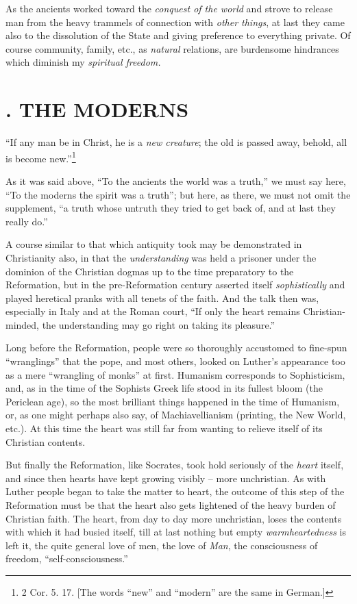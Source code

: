 \documentclass[12pt,a4paper]{book}
\begin{document}
As the ancients worked toward the \textit{conquest of the world} and strove to 
release man from the heavy trammels of connection with \textit{other things}, 
at last they came also to the dissolution of the State and giving preference 
to everything private. Of course community, family, etc., as \textit{natural} 
relations, are burdensome hindrances which diminish my \textit{spiritual 
freedom.}

\medskip{}

\section[2. The Moderns]{. THE MODERNS}

``If any man be in Christ, he is a \textit{new creature}; the old is passed 
away, behold, all is become new.''\footnote{2 Cor. 5. 17. [The words 
``new'' and ``modern'' are the same in German.]}

As it was said above, ``To the ancients the world was a truth,'' we must say 
here, ``To the moderns the spirit was a truth''; but here, as there, we must 
not omit the supplement, ``a truth whose untruth they tried to get back of, 
and at last they really do.''

A course similar to that which antiquity took may be demonstrated in 
Christianity also, in that the \textit{understanding} was held a prisoner 
under the dominion of the Christian dogmas up to the time preparatory to the 
Reformation, but in the pre-Reformation century asserted itself 
\textit{sophistically} and played heretical pranks with all tenets of the 
faith. And the talk then was, especially in Italy and at the Roman court, 
``If only the heart remains Christian-minded, the understanding may go right 
on taking its pleasure.''

Long before the Reformation, people were so thoroughly accustomed to fine-spun 
``wranglings'' that the pope, and most others, looked on Luther's appearance 
too as a mere ``wrangling of monks'' at first. Humanism corresponds to 
Sophisticism, and, as in the time of the Sophists Greek life stood in its 
fullest bloom (the Periclean age), so the most brilliant things happened in 
the time of Humanism, or, as one might perhaps also say, of Machiavellianism 
(printing, the New World, etc.). At this time the heart was still far from 
wanting to relieve itself of its Christian contents.

But finally the Reformation, like Socrates, took hold seriously of the 
\textit{heart} itself, and since then hearts have kept growing visibly -- more 
unchristian. As with Luther people began to take the matter to heart, the 
outcome of this step of the Reformation must be that the heart also gets 
lightened of the heavy burden of Christian faith. The heart, from day to day 
more unchristian, loses the contents with which it had busied itself, till at 
last nothing but empty \textit{warmheartedness} is left it, the quite general 
love of men, the love of \textit{Man}, the consciousness of freedom, 
``self-consciousness.''
\end{document}
